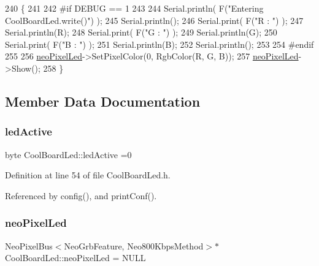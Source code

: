 \begin{DoxyCode}
240 \{
241 
242 \textcolor{preprocessor}{#if DEBUG == 1}
243 
244     Serial.println( F(\textcolor{stringliteral}{"Entering CoolBoardLed.write()"}) );
245     Serial.println();
246     Serial.print( F(\textcolor{stringliteral}{"R : "}) );
247     Serial.println(R);
248     Serial.print( F(\textcolor{stringliteral}{"G : "}) );
249     Serial.println(G);
250     Serial.print( F(\textcolor{stringliteral}{"B : "}) );
251     Serial.println(B);
252     Serial.println();   
253 
254 \textcolor{preprocessor}{#endif}
255 
256     \hyperlink{classCoolBoardLed_ac2c13fa462a010cd9242bf297c013923}{neoPixelLed}->SetPixelColor(0, RgbColor(R, G, B));
257     \hyperlink{classCoolBoardLed_ac2c13fa462a010cd9242bf297c013923}{neoPixelLed}->Show();
258 \}
\end{DoxyCode}


\subsection{Member Data Documentation}
\mbox{\label{classCoolBoardLed_a5f17c135516fcf4b44ea8a096ba0177a}} 
\subsubsection{\texorpdfstring{led\+Active}{ledActive}}
{\footnotesize\ttfamily byte Cool\+Board\+Led\+::led\+Active =0\hspace{0.3cm}{\ttfamily [private]}}



Definition at line 54 of file Cool\+Board\+Led.\+h.



Referenced by config(), and print\+Conf().

\mbox{\label{classCoolBoardLed_ac2c13fa462a010cd9242bf297c013923}} 
\subsubsection{\texorpdfstring{neo\+Pixel\+Led}{neoPixelLed}}
{\footnotesize\ttfamily Neo\+Pixel\+Bus$<$Neo\+Grb\+Feature, Neo800\+Kbps\+Method$>$$\ast$ Cool\+Board\+Led\+::neo\+Pixel\+Led = N\+U\+LL\hspace{0.3cm}{\ttfamily [private]}}



